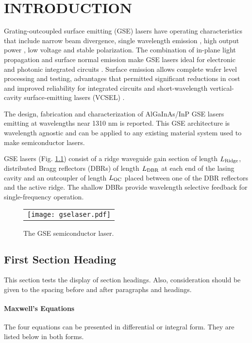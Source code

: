 
\chapter{INTRODUCTION} \label{ch:introduction}

Grating-outcoupled surface emitting (GSE) lasers have operating
characteristics that include narrow beam divergence, single wavelength
emission \cite{Masood04}, high output power \cite{Evans91}, low
voltage and stable polarization. The combination of in-plane light
propagation and surface normal emission make GSE lasers ideal for
electronic and photonic integrated circuits \cite{Eriksson95}. Surface
emission allows complete wafer level processing and testing,
advantages that permitted significant reductions in cost and improved
reliability for integrated circuits and short-wavelength
vertical-cavity surface-emitting lasers (VCSEL) \cite{Evans93}.

The design, fabrication and characterization of AlGaInAs/InP GSE
lasers emitting at wavelengths near 1310 nm is reported. This GSE
architecture is wavelength agnostic and can be applied to any existing
material system used to make semiconductor lasers.

GSE lasers (Fig. \ref{phtd3Dview}) consist of a ridge waveguide
gain section of length $L_{\rm {Ridge}}$, distributed Bragg reflectors
(DBRs) of length $L_{\rm {DBR}}$ at each end of the lasing cavity and an
outcoupler of length $L_{\rm {OC}}$ placed between one of the DBR reflectors
and the active ridge. The shallow DBRs provide wavelength selective
feedback for single-frequency operation.

\begin{figure}[ht]
\begin{tabular}{c}
\centerline{\texttt{[image: gselaser.pdf]}}
\end{tabular}
\caption{\small{The GSE semiconductor laser.}}
\label{phtd3Dview}
\end{figure}

\section{First Section Heading}

This section tests the display of section headings.  Also,
consideration should be given to the spacing before and after
paragraphs and headings.

\subsubsection{Maxwell's Equations}
The four equations can be presented in differential or integral
form. They are listed below in both forms.

